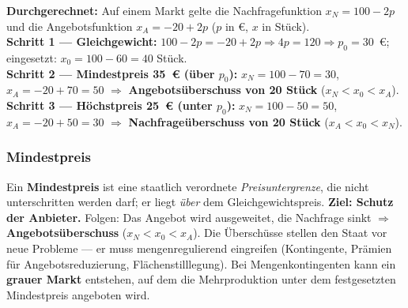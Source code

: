 \documentclass[11pt, a4paper]{article}
\begin{document}
\begin{center}
\end{center}

\begin{beispiel}
\textbf{Durchgerechnet:} Auf einem Markt gelte die Nachfragefunktion $x_N = 100 - 2p$
und die Angebotsfunktion $x_A = -20 + 2p$ ($p$ in €, $x$ in Stück).\\[0.3em]
\textbf{Schritt 1 --- Gleichgewicht:} $100 - 2p = -20 + 2p \Rightarrow 4p = 120
\Rightarrow p_0 = 30$~€; eingesetzt: $x_0 = 100 - 60 = 40$ Stück.\\
\textbf{Schritt 2 --- Mindestpreis 35~€ (über $p_0$):} $x_N = 100 - 70 = 30$,
$x_A = -20 + 70 = 50$ $\Rightarrow$ \textbf{Angebotsüberschuss von 20 Stück}
($x_N < x_0 < x_A$).\\
\textbf{Schritt 3 --- Höchstpreis 25~€ (unter $p_0$):} $x_N = 100 - 50 = 50$,
$x_A = -20 + 50 = 30$ $\Rightarrow$ \textbf{Nachfrageüberschuss von 20 Stück}
($x_A < x_0 < x_N$).
\end{beispiel}

\subsubsection{Mindestpreis}

Ein \textbf{Mindestpreis} ist eine staatlich verordnete \emph{Preisuntergrenze}, die
nicht unterschritten werden darf; er liegt \emph{über} dem Gleichgewichtspreis.
\textbf{Ziel: Schutz der Anbieter.} Folgen: Das Angebot wird ausgeweitet, die Nachfrage
sinkt $\Rightarrow$ \textbf{Angebotsüberschuss} ($x_N < x_0 < x_A$). Die Überschüsse
stellen den Staat vor neue Probleme --- er muss mengenregulierend eingreifen
(Kontingente, Prämien für Angebotsreduzierung, Flächenstilllegung). Bei
Mengenkontingenten kann ein \textbf{grauer Markt} entstehen, auf dem die Mehrproduktion
unter dem festgesetzten Mindestpreis angeboten wird.
\end{document}
